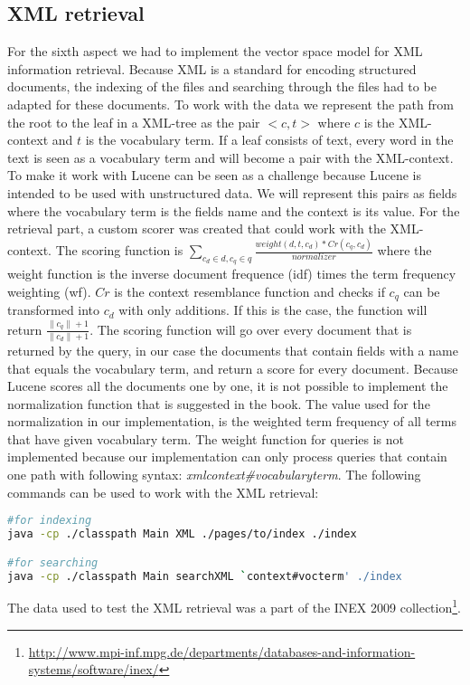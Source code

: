 \documentclass{article}
\begin{document}
\subsection{XML retrieval}
For the sixth aspect we had to implement the vector space model for XML information retrieval.
Because XML is a standard for encoding structured documents, the indexing of the files and searching
through the files had to be adapted for these documents. To work with the data we represent the path from the root to
the leaf in a XML-tree as the pair $<c,t>$ where $c$ is the XML-context and $t$ is the vocabulary term. If a leaf consists
of text, every word in the text is seen as a vocabulary term and will become a pair with the XML-context.
To make it work with Lucene can be seen as a challenge because Lucene is intended to be used with unstructured data.
We will represent this pairs as fields where the vocabulary term is the fields name and the context is its value.
For the retrieval part, a custom scorer was created that could work with the XML-context.
The scoring function is $\sum_{c_{d} \in d, c_{q} \in q}\frac{weight(d,t,c_{d}) * Cr(c_{q}, c_{d})}{normalizer}$ where the weight function is the
inverse document frequence (idf) times the term frequency weighting (wf). $Cr$ is the context resemblance function and checks
if $c_{q}$ can be transformed into $c_{d}$ with only additions. If this is the case, the function will return $\frac{\|c_{q}\| + 1}{\|c_{d}\| + 1}$.
The scoring function will go over every document that is returned by the query, in our case the documents that contain
fields with a name that equals the vocabulary term, and return a score for every document.
Because Lucene scores all the documents one by one, it is not possible to implement the normalization function that is
suggested in the book. The value used for the normalization in our implementation, is the weighted term frequency of all terms
that have given vocabulary term.
The weight function for queries is not implemented because our implementation can only process queries that contain one
path with following syntax: \emph{xml\/context\#vocabularyterm}.
The following commands can be used to work with the XML retrieval:
\begin{lstlisting}[language=Bash, label={lst:search}]
#for indexing
java -cp ./classpath Main XML ./pages/to/index ./index

#for searching
java -cp ./classpath Main searchXML `context#vocterm' ./index
\end{lstlisting}
The data used to test the XML retrieval was a part of the INEX 2009 collection\footnote{\url{http://www.mpi-inf.mpg.de/departments/databases-and-information-systems/software/inex/}}.
\end{document}
